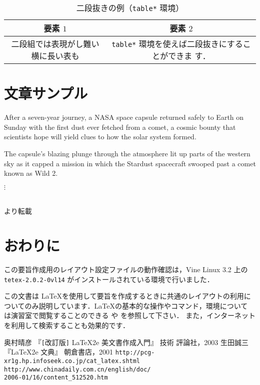 \documentclass[a4j,9pt,twocolumn]{jsarticle}
\begin{document}
\begin{table*}
 \caption{二段抜きの例（\texttt{table*} 環境）}
 \label{tab:exp}
 \vspace{-1em}
 \begin{center}
  \begin{tabular}{|c|c|}
   \hline
   要素 $1$&要素 $2$\\
   \hline
   二段組では表現がし難い横に長い表も&\texttt{table*} 環境を使えば二段抜きにすることができま
   す．\\
   \hline
  \end{tabular}
 \end{center}
\end{table*}

\section{文章サンプル}
After a seven-year journey, a NASA space capsule returned safely to
Earth on Sunday with the first dust ever fetched from a comet, a cosmic
bounty that scientists hope will yield clues to how the solar system
formed.

The capsule's blazing plunge through the atmosphere lit up parts of the
western sky as it capped a mission in which the Stardust spacecraft
swooped past a comet known as Wild 2.
\centerline{$\vdots$}\\[-0.5em]
\hfill{\cite{web2} より転載}
\section{おわりに}
この要旨作成用のレイアウト設定ファイルの動作確認は，Vine Linux 3.2 上の
\texttt{tetex-2.0.2-0vl14} がインストールされている環境で行いました．

この文書は \LaTeX を使用して要旨を作成するときに共通のレイアウトの利用に
ついてのみ説明しています．\LaTeX の基本的な操作やコマンド，環境について
は演習室で閲覧することのできる \cite{美} や \cite{典} を参照して下さい．
また，インターネットを利用して検索することも効果的です．

\begin{thebibliography}{9}
  奥村晴彦 『\verb#[#改訂版\verb#]# \LaTeX2e 美文書作成入門』 技術
       評論社，2003
  生田誠三 『\LaTeX2e 文典』 朝倉書店，2001
  \texttt{http://pcg-xr1g.hp.infoseek.co.jp/cat\_latex.shtml}
  \texttt{http://www.chinadaily.com.cn/english/doc/\\2006-01/16/content\_512520.htm}
\end{thebibliography}
\end{document}

